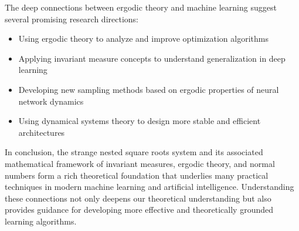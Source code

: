 \documentclass[12pt,a4paper]{article}
\begin{document}
The deep connections between ergodic theory and machine learning suggest several promising research directions:

\begin{itemize}
    \item Using ergodic theory to analyze and improve optimization algorithms
    \item Applying invariant measure concepts to understand generalization in deep learning
    \item Developing new sampling methods based on ergodic properties of neural network dynamics
    \item Using dynamical systems theory to design more stable and efficient architectures
\end{itemize}

In conclusion, the strange nested square roots system and its associated mathematical framework of invariant measures, ergodic theory, and normal numbers form a rich theoretical foundation that underlies many practical techniques in modern machine learning and artificial intelligence. Understanding these connections not only deepens our theoretical understanding but also provides guidance for developing more effective and theoretically grounded learning algorithms.
\end{document}
